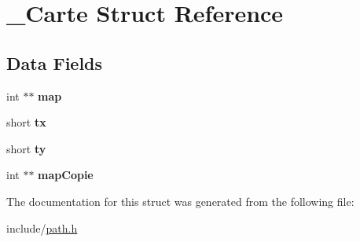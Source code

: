 \hypertarget{struct___carte}{\section{\-\_\-\-Carte Struct Reference}
\label{struct___carte}
}
\subsection*{Data Fields}
\begin{DoxyCompactItemize}
\item 
\hypertarget{struct___carte_a19cd3cde8a8065daebb3d00e456a1925}{int $\ast$$\ast$ {\bfseries map}}\label{struct___carte_a19cd3cde8a8065daebb3d00e456a1925}

\item 
\hypertarget{struct___carte_ad1b83eaeefd4129c29ecf7e2f689112a}{short {\bfseries tx}}\label{struct___carte_ad1b83eaeefd4129c29ecf7e2f689112a}

\item 
\hypertarget{struct___carte_add576106a373875e128935be71849c1e}{short {\bfseries ty}}\label{struct___carte_add576106a373875e128935be71849c1e}

\item 
\hypertarget{struct___carte_a917fa661cfa0de8050bb03c6c053439c}{int $\ast$$\ast$ {\bfseries map\-Copie}}\label{struct___carte_a917fa661cfa0de8050bb03c6c053439c}

\end{DoxyCompactItemize}


The documentation for this struct was generated from the following file\-:\begin{DoxyCompactItemize}
\item 
include/\hyperlink{path_8h}{path.\-h}\end{DoxyCompactItemize}
